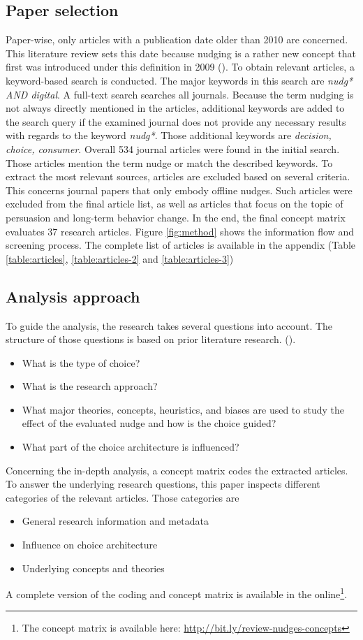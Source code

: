 \subsection{Paper selection}
Paper-wise, only articles with a publication date older than 2010 are concerned. This literature review sets this date because nudging is a rather new concept that first was introduced under this definition in 2009 (\cite{thaler_nudge:_2009}). To obtain relevant articles, a keyword-based search is conducted. The major keywords in this search are \textit{nudg* AND digital}. A full-text search searches all journals. Because the term nudging is not always directly mentioned in the articles, additional keywords are added to the search query if the examined journal does not provide any necessary results with regards to the keyword \textit{nudg*}. Those additional keywords are \textit{decision, choice, consumer}. Overall 534 journal articles were found in the initial search. Those articles mention the term nudge or match the described keywords. To extract the most relevant sources, articles are excluded based on several criteria. This concerns journal papers that only embody offline nudges. Such articles were excluded from the final article list, as well as articles that focus on the topic of persuasion and long-term behavior change. In the end, the final concept matrix evaluates 37 research articles. Figure \ref{fig:method} shows the information flow and screening process. The complete list of articles is available in the appendix (Table \ref{table:articles}, \ref{table:articles-2} and \ref{table:articles-3})

\subsection{Analysis approach}
To guide the analysis, the research takes several questions into account. The structure of those questions is based on prior literature research. (\cite{alavi_review_1992}).
\begin{itemize}
\item What is the type of choice?
\item What is the research approach?
\item What major theories, concepts, heuristics, and biases are used to study the effect of the evaluated nudge and how is the choice guided?
\item What part of the choice architecture is influenced?
\end{itemize}

Concerning the in-depth analysis, a concept matrix codes the extracted articles. To answer the underlying research questions, this paper inspects different categories of the relevant articles. Those categories are 
\begin{itemize}
\item General research information and metadata
\item Influence on choice architecture
\item Underlying concepts and theories
\end{itemize}

A complete version of the coding and concept matrix is available in the online\footnote{The concept matrix is available here: \url{http://bit.ly/review-nudges-concepts}}.